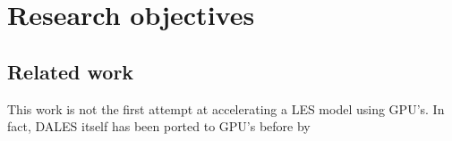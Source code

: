 \section{Research objectives}


\subsection{Related work}

This work is not the first attempt at accelerating a LES model using GPU's. In fact, DALES itself has been ported to GPU's before by 